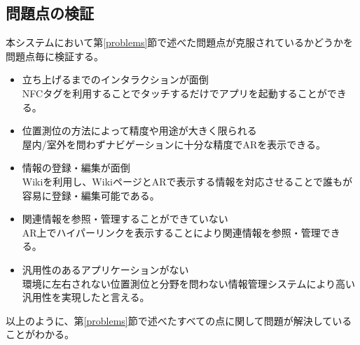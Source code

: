 \subsection{問題点の検証}
本システムにおいて第\ref{problems}節で述べた問題点が克服されているかどうかを問題点毎に検証する。
\begin{itemize}
  \item 立ち上げるまでのインタラクションが面倒 \\
  NFCタグを利用することでタッチするだけでアプリを起動することができる。
  \item 位置測位の方法によって精度や用途が大きく限られる \\
  屋内/室外を問わずナビゲーションに十分な精度でARを表示できる。
  \item 情報の登録・編集が面倒 \\
  Wikiを利用し、WikiページとARで表示する情報を対応させることで誰もが容易に登録・編集可能である。
  \item 関連情報を参照・管理することができていない \\
  AR上でハイパーリンクを表示することにより関連情報を参照・管理できる。
  \item 汎用性のあるアプリケーションがない \\
  環境に左右されない位置測位と分野を問わない情報管理システムにより高い汎用性を実現したと言える。
\end{itemize}
以上のように、第\ref{problems}節で述べたすべての点に関して問題が解決していることがわかる。